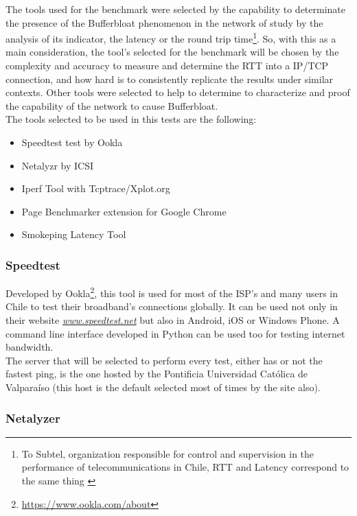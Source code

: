 The tools used for the benchmark were selected by the capability to determinate 
the presence of the Bufferbloat phenomenon in the network of study by the 
analysis of its indicator, the latency or the round trip time\footnote{To 
Subtel, organization responsible for control and supervision in the performance 
of telecommunications in Chile, RTT and Latency correspond to the same thing 
\cite{subtel} }. So, with this as a main consideration, the tool's selected for 
the benchmark will be chosen by the complexity and accuracy to measure and 
determine the RTT into a IP/TCP connection, and how hard is to consistently 
replicate the results under similar contexts. Other tools were selected to help 
to determine to characterize and proof the capability of the network to cause 
Bufferbloat.\\

The tools selected to be used in this tests are the following:

\begin{itemize}
    \item Speedtest test by Ookla
    \item Netalyzr by ICSI
    \item Iperf Tool with Tcptrace/Xplot.org
    \item Page Benchmarker extension for Google Chrome
    \item Smokeping Latency Tool
\end{itemize}

\subsubsection{Speedtest}

Developed by Ookla\footnote{\url{https://www.ookla.com/about}}, this tool is used
for most of the ISP's and many users in Chile to test their broadband's
connections globally. It can be used not only in their website 
\href{http://www.speedtest.net}{\textit{www.speedtest.net}} but also in Android,
iOS or Windows Phone. A command line interface developed in Python can be used 
too for testing internet bandwidth.\\

The server that will be selected to perform every test, either has or not the
fastest ping, is the one hosted by the Pontificia Universidad Cat\'olica de
Valpara\'iso (this host is the default selected most of times by the site also).  

\subsubsection{Netalyzer\cite{netalyzr}}

